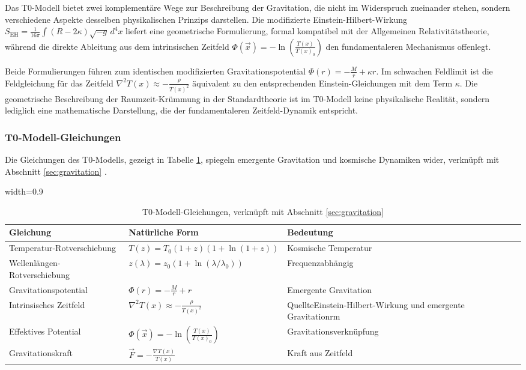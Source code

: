 \documentclass[12pt,a4paper]{article}
\newcommand{\Tfield}{T(x)}
\newcommand{\tablescale}{0.9}
\begin{document}
	Das T0-Modell bietet zwei komplementäre Wege zur Beschreibung der Gravitation, die nicht im Widerspruch zueinander stehen, sondern verschiedene Aspekte desselben physikalischen Prinzips darstellen. Die modifizierte Einstein-Hilbert-Wirkung $S_{\mathrm{EH}} = \frac{1}{16\pi} \int (R - 2\kappa) \sqrt{-g} \, d^4x$ liefert eine geometrische Formulierung, formal kompatibel mit der Allgemeinen Relativitätstheorie, während die direkte Ableitung aus dem intrinsischen Zeitfeld $\Phi(\vec{x}) = -\ln\left(\frac{\Tfield}{\Tfield_0}\right)$ den fundamentaleren Mechanismus offenlegt.
	
	Beide Formulierungen führen zum identischen modifizierten Gravitationspotential $\Phi(r) = -\frac{M}{r} + \kappa r$. Im schwachen Feldlimit ist die Feldgleichung für das Zeitfeld $\nabla^2\Tfield \approx -\frac{\rho}{\Tfield^2}$ äquivalent zu den entsprechenden Einstein-Gleichungen mit dem Term $\kappa$. Die geometrische Beschreibung der Raumzeit-Krümmung in der Standardtheorie ist im T0-Modell keine physikalische Realität, sondern lediglich eine mathematische Darstellung, die der fundamentaleren Zeitfeld-Dynamik entspricht.
	\subsubsection{T0-Modell-Gleichungen}
	\label{subsec:t0_equations}
	
	Die Gleichungen des T0-Modells, gezeigt in Tabelle \ref{tab:t0_equations}, spiegeln emergente Gravitation und kosmische Dynamiken wider, verknüpft mit Abschnitt \ref{sec:gravitation} \cite{pascher_emergente_2025}.
	
	\begin{table}[htbp]
		\centering
		\begin{adjustbox}{width=\tablescale\textwidth}
			\begin{tabular}{lll}
				\toprule
				\textbf{Gleichung} & \textbf{Natürliche Form} & \textbf{Bedeutung} \\
				\midrule
				Temperatur-Rotverschiebung & \(T(z) = T_0 (1+z)(1+\ln(1+z))\) & Kosmische Temperatur \\
				Wellenlängen-Rotverschiebung & \(z(\lambda) = z_0 (1+\ln(\lambda/\lambda_0))\) & Frequenzabhängig \\
				Gravitationspotential & \(\Phi(r) = -\frac{M}{r} + r\) & Emergente Gravitation \\
				Intrinsisches Zeitfeld & \(\nabla^2 \Tfield \approx -\frac{\rho}{\Tfield^2}\) & QuellteEinstein-Hilbert-Wirkung und emergente Gravitationrm \\
				Effektives Potential & \(\Phi(\vec{x}) = -\ln\left(\frac{\Tfield}{\Tfield_0}\right)\) & Gravitationsverknüpfung \\
				Gravitationskraft & \(\vec{F} = -\frac{\nabla \Tfield}{\Tfield}\) & Kraft aus Zeitfeld \\
				\bottomrule
			\end{tabular}
		\end{adjustbox}
		\caption{T0-Modell-Gleichungen, verknüpft mit Abschnitt \ref{sec:gravitation}}
		\label{tab:t0_equations}
	\end{table}
	
\end{document}
